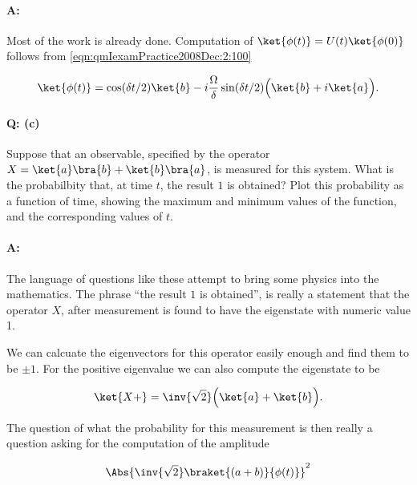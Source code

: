\paragraph{A:}

Most of the work is already done.  Computation of $\ket{\phi(t)} = U(t) \ket{\phi(0)}$ follows from \ref{eqn:qmIexamPractice2008Dec:2:100}

\begin{equation}\label{eqn:qmIexamPractice2008Dec:2:110}
\ket{\phi(t)} =
\cos(\delta t/2) \ket{b}
- i \frac{\Omega}{\delta} \sin(\delta t/2) \Bigl( 
\ket{b} +i \ket{a}
\Bigr).
\end{equation}

\paragraph{Q: (c)}

Suppose that an observable, specified by the operator $X = 
\ket{a}\bra{b}
+ \ket{b}\bra{a}$, is measured for this system.  What is the probabilbity that, at time $t$, the result $1$ is obtained?  Plot this probability as a function of time, showing the maximum and minimum values of the function, and the corresponding values of $t$.

\paragraph{A:}

The language of questions like these attempt to bring some physics into the mathematics.  The phrase ``the result $1$ is obtained'', is really a statement that the operator $X$, after measurement is found to have the eigenstate with numeric value 1.

We can calcuate the eigenvectors for this operator easily enough and find them to be $\pm 1$.  For the positive eigenvalue we can also compute the eigenstate to be

\begin{equation}\label{eqn:qmIexamPractice2008Dec:2:120}
\ket{X+} = \inv{\sqrt{2}} \Bigl( \ket{a} + \ket{b} \Bigr).
\end{equation}

The question of what the probability for this measurement is then really a question asking for the computation of the amplitude

\begin{equation}\label{eqn:qmIexamPractice2008Dec:2:130}
\Abs{
\inv{\sqrt{2}}
\braket{
 (a + b)}{\phi(t)}}^2
\end{equation}

